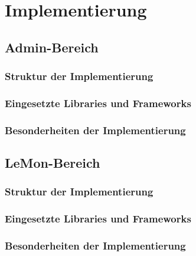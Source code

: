 \chapter{Implementierung}

\section{Admin-Bereich}
\subsection{Struktur der Implementierung}

\subsection{Eingesetzte Libraries und Frameworks}

\subsection{Besonderheiten der Implementierung}


\section{LeMon-Bereich}
\subsection{Struktur der Implementierung}

\subsection{Eingesetzte Libraries und Frameworks}

\subsection{Besonderheiten der Implementierung}
